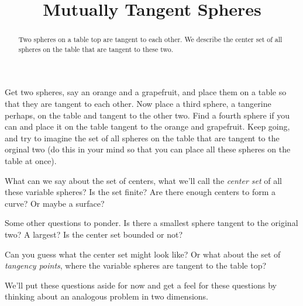 \documentclass{ximera}
\title{Mutually Tangent Spheres}
\begin{document}
\begin{abstract}
Two spheres on a table top are tangent to each other. We describe the center set of all spheres on the table that are tangent to these two. 
\end{abstract}
\maketitle

Get two spheres, say an orange and a grapefruit, and place them on a table so that they are tangent to each other. Now place a third sphere, a tangerine perhaps, on the table and tangent to the other two. Find a fourth sphere if you can and place it on the table tangent to the orange and grapefruit. Keep going, and try to imagine the set of all spheres on the table that are tangent to the orginal two (do this in your mind so that you can place all these spheres on the table at once). 

What can we say about the set of centers, what we'll call the \emph{center set} of all these variable spheres? Is the set finite? Are there enough centers to form a curve? Or maybe a surface?

Some other questions to ponder. Is there a smallest sphere tangent to the original two? A largest? Is the center set bounded or not?

Can you guess what the center set might look like? Or what about the set of \emph{tangency points}, where the variable spheres are tangent to the table top?

We'll put these questions aside for now and get a feel for these questions by thinking about an analogous problem in two dimensions.
\end{document}
